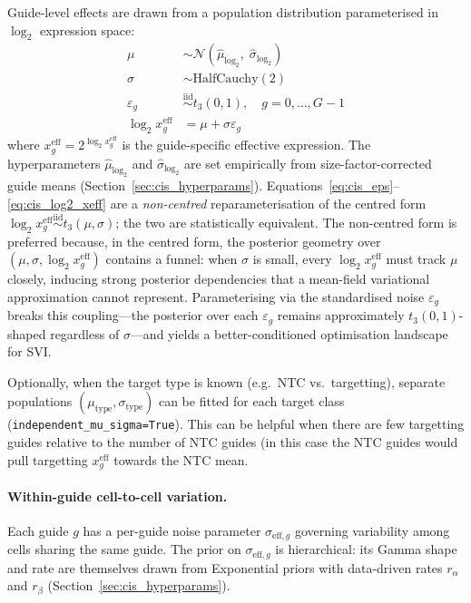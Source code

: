 \documentclass[12pt]{article}
\newcommand{\iid}{\overset{\mathrm{iid}}{\sim}}
\begin{document}
Guide-level effects are drawn from a population distribution parameterised in $\log_2$ expression
space:
\begin{align}
  \mu &\sim \mathcal{N}\!\left(\hat\mu_{\log_2},\; \hat\sigma_{\log_2}\right)
      \label{eq:cis_pop_mu} \\
  \sigma &\sim \mathrm{HalfCauchy}(2)
      \label{eq:cis_pop_sigma} \\
  \varepsilon_g &\iid t_3(0, 1), \quad g = 0,\ldots,G-1
      \label{eq:cis_eps} \\
  \log_2 x_g^{\mathrm{eff}} &= \mu + \sigma \varepsilon_g
      \label{eq:cis_log2_xeff}
\end{align}
%
where $x_g^{\mathrm{eff}} = 2^{\log_2 x_g^{\mathrm{eff}}}$ is the guide-specific effective
expression.  The hyperparameters $\hat\mu_{\log_2}$ and $\hat\sigma_{\log_2}$ are set
empirically from size-factor-corrected guide means (Section~\ref{sec:cis_hyperparams}).
Equations~\eqref{eq:cis_eps}--\eqref{eq:cis_log2_xeff} are a \emph{non-centred} reparameterisation
of the centred form $\log_2 x_g^{\mathrm{eff}} \iid t_3(\mu, \sigma)$; the two are statistically
equivalent. The non-centred form is preferred because, in the centred form, the posterior geometry
over $(\mu, \sigma, {\log_2 x_g^{\mathrm{eff}}})$ contains a funnel: when $\sigma$ is small,
every $\log_2 x_g^{\mathrm{eff}}$ must track $\mu$ closely, inducing strong posterior dependencies
that a mean-field variational approximation cannot represent. Parameterising via the standardised
noise $\varepsilon_g$ breaks this coupling—the posterior over each $\varepsilon_g$ remains
approximately $t_3(0,1)$-shaped regardless of $\sigma$—and yields a better-conditioned
optimisation landscape for SVI.

Optionally, when the target type is known (e.g.\ NTC vs.\ targetting), separate populations
$(\mu_{\mathrm{type}}, \sigma_{\mathrm{type}})$ can be fitted for each target class
(\texttt{independent\_mu\_sigma=True}). This can be helpful when there are few targetting
guides relative to the number of NTC guides (in this case the NTC guides would pull targetting
$x_g^{\mathrm{eff}}$ towards the NTC mean.

\paragraph{Within-guide cell-to-cell variation.}

Each guide $g$ has a per-guide noise parameter $\sigma_{\mathrm{eff},g}$ governing
variability among cells sharing the same guide.
The prior on $\sigma_{\mathrm{eff},g}$ is hierarchical: its Gamma shape and rate are
themselves drawn from Exponential priors with data-driven rates $r_\alpha$ and $r_\beta$
(Section~\ref{sec:cis_hyperparams}).
\end{document}
